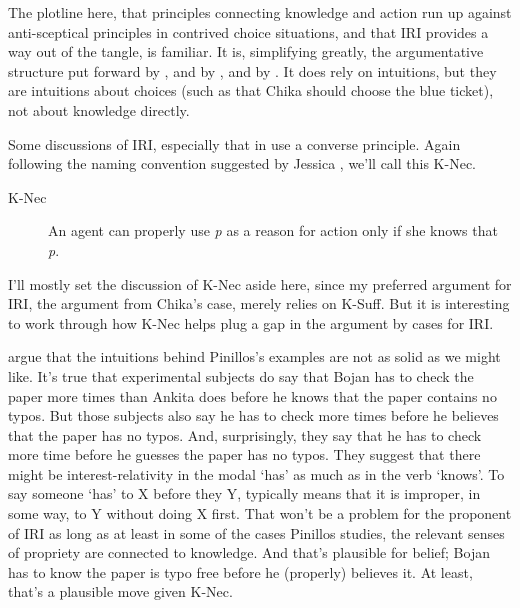 The plotline here, that principles connecting knowledge and action run up against anti-sceptical principles in contrived choice situations, and that IRI provides a way out of the tangle, is familiar. It is, simplifying greatly, the argumentative structure put forward by  \citet{Hawthorne2004}, and by  \citet{FantlMcGrath2002, FantlMcGrath2009}, and by  \citet{Weatherson2012}. It does rely on intuitions, but they are intuitions about choices (such as that Chika should choose the blue ticket), not about knowledge directly.

Some discussions of IRI, especially that in  \citet{HawthorneStanley2008} use a converse principle. Again following the naming convention suggested by Jessica  \citet{Brown2013}, we'll call this K-Nec.

\begin{description}

\item[K-Nec]

An agent can properly use \emph{p} as a reason for action only if she knows that \emph{p}.
\end{description}
I'll mostly set the discussion of K-Nec aside here, since my preferred argument for IRI, the argument from Chika's case, merely relies on K-Suff. But it is interesting to work through how K-Nec helps plug a gap in the argument by cases for IRI.

 \citet{BuckwalterSchaffer2015} argue that the intuitions behind Pinillos's examples are not as solid as we might like. It's true that experimental subjects do say that Bojan has to check the paper more times than Ankita does before he knows that the paper contains no typos. But those subjects also say he has to check more times before he believes that the paper has no typos. And, surprisingly, they say that he has to check more time before he guesses the paper has no typos. They suggest that there might be interest-relativity in the modal `has' as much as in the verb `knows'. To say someone `has' to X before they Y, typically means that it is improper, in some way, to Y without doing X first. That won't be a problem for the proponent of IRI as long as at least in some of the cases Pinillos studies, the relevant senses of propriety are connected to knowledge. And that's plausible for belief; Bojan has to know the paper is typo free before he (properly) believes it. At least, that's a plausible move given K-Nec.

